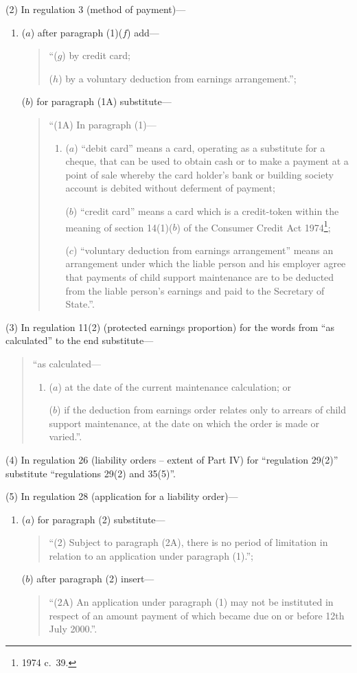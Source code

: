 \documentclass[12pt,a4paper]{article}
\begin{document}
(2) In regulation 3 (method of payment)—
\begin{enumerate}\item[]
($a$) after paragraph (1)($f$)  add—
\begin{quotation}
“($g$) by credit card;

($h$) by a voluntary deduction from earnings arrangement.”;
\end{quotation}

($b$) for paragraph (1A) substitute—
\begin{quotation}
“(1A) In paragraph (1)—
\begin{enumerate}\item[]
($a$) “debit card” means a card, operating as a substitute for a cheque, that can be used to obtain cash or to make a payment at a point of sale whereby the card holder’s bank or building society account is debited without deferment of payment;

($b$) “credit card” means a card which is a credit-token within the meaning of section 14(1)($b$)  of the Consumer Credit Act 1974\footnote{1974 c.\ 39.};

($c$) “voluntary deduction from earnings arrangement” means an arrangement under which the liable person and his employer agree that payments of child support maintenance are to be deducted from the liable person’s earnings and paid to the Secretary of State.”.
\end{enumerate}
\end{quotation}
\end{enumerate}

(3) In regulation 11(2) (protected earnings proportion) for the words from “as calculated” to the end substitute—
\begin{quotation}
    “as calculated—
\begin{enumerate}\item[]
    ($a$) 
    at the date of the current maintenance calculation; or

    ($b$) 
    if the deduction from earnings order relates only to arrears of child support maintenance, at the date on which the order is made or varied.”. 
\end{enumerate}
\end{quotation}

(4) In regulation 26 (liability orders – extent of Part IV) for “regulation 29(2)” substitute “regulations 29(2) and 35(5)”.

(5) In regulation 28 (application for a liability order)—
\begin{enumerate}\item[]
($a$) for paragraph (2) substitute—
\begin{quotation}
“(2) Subject to paragraph (2A), there is no period of limitation in relation to an application under paragraph (1).”;
\end{quotation}

($b$) after paragraph (2) insert—
\begin{quotation}
“(2A) An application under paragraph (1) may not be instituted in respect of an amount payment of which became due on or before 12th July 2000.”.
\end{quotation}
\end{enumerate}
\end{document}
